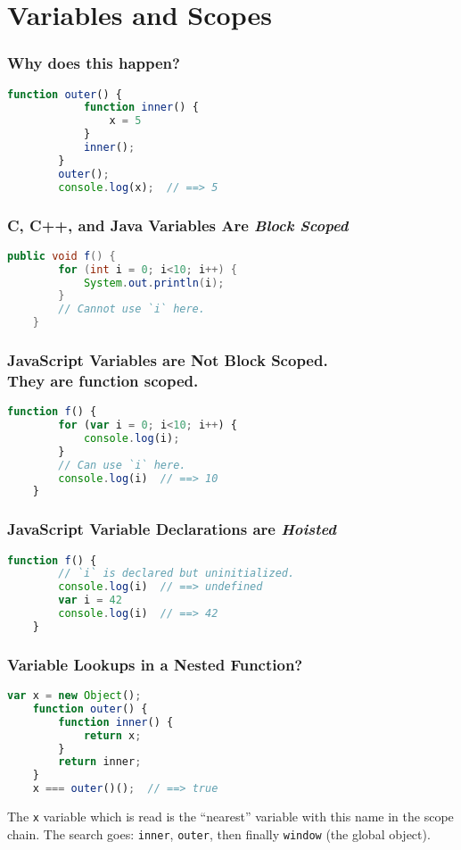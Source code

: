 \section{Variables and Scopes}

\begin{frame}[fragile]
    \frametitle{Why does this happen?}
    \begin{lstlisting}[language=JavaScript]
        function outer() {
            function inner() {
                x = 5
            }
            inner();
        }
        outer();
        console.log(x);  // ==> 5
    \end{lstlisting}
\end{frame}

\begin{frame}[fragile]
    \frametitle{C, C++, and Java Variables Are \textit{Block Scoped}}
    \begin{lstlisting}[language=Java]
    public void f() {
        for (int i = 0; i<10; i++) {
            System.out.println(i);
        }
        // Cannot use `i` here.
    }
    \end{lstlisting}
\end{frame}

\begin{frame}[fragile]
    \frametitle{JavaScript Variables are \textbf{Not} Block Scoped.\\
                They are function scoped.}
    \begin{lstlisting}[language=JavaScript]
    function f() {
        for (var i = 0; i<10; i++) {
            console.log(i);
        }
        // Can use `i` here.
        console.log(i)  // ==> 10
    }\end{lstlisting}
\end{frame}

\begin{frame}[fragile]
    \frametitle{JavaScript Variable Declarations are \textit{Hoisted}}
    \begin{lstlisting}[language=JavaScript]
    function f() {
        // `i` is declared but uninitialized.
        console.log(i)  // ==> undefined
        var i = 42
        console.log(i)  // ==> 42
    }
    \end{lstlisting}
\end{frame}

\begin{frame}[fragile]
    \frametitle{Variable Lookups in a Nested Function?}
    \begin{lstlisting}[language=JavaScript]
    var x = new Object();
    function outer() {
        function inner() {
            return x;
        }
        return inner;
    }
    x === outer()();  // ==> true
    \end{lstlisting}

    The \texttt{x} variable which is read is the ``nearest'' variable with this
    name in the scope chain. The search goes: \texttt{inner}, \texttt{outer},
    then finally \texttt{window} (the global object).
\end{frame}

